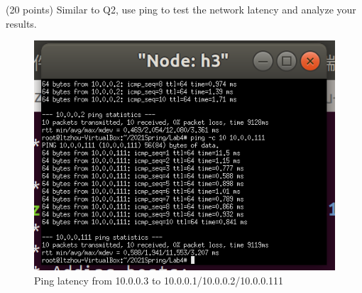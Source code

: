 \begin{exercise}[]{(20 points) Similar to Q2, use ping to test the network latency and analyze your results.}
\begin{solution}
\begin{figure}[ht]
\begin{center}
\begin{minipage}[t]{0.3\linewidth}
            \includegraphics[width=0.9\linewidth]{img/lab4/ex3-4.png}
        \end{minipage}
        \caption{Ping latency from 10.0.0.3 to 10.0.0.1/10.0.0.2/10.0.0.111
        \label{fig:ex3-2}}
        \end{center}
    \end{figure}
  \end{solution}
  \label{ex3}
\end{exercise}